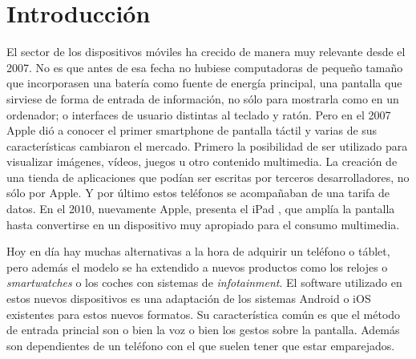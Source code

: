 \documentclass[
10pt, %
a4paper, %
oneside, %
headinclude,footinclude, %
BCOR5mm, %
]{scrartcl}
\begin{document}
{\let\thefootnote\relax{}}

{\let\thefootnote\relax{}}


\newpage %

\section{Introducción}
El sector de los dispositivos móviles ha crecido de manera muy relevante desde el 2007. No es que antes de esa fecha no hubiese computadoras de pequeño tamaño que incorporasen una batería como fuente de energía principal, una pantalla que sirviese de forma de entrada de información, no sólo para mostrarla como en un ordenador; o interfaces de usuario distintas al teclado y ratón. Pero en el 2007 Apple dió a conocer el primer smartphone de pantalla táctil \cite{rob_price_how_2015} y varias de sus características cambiaron el mercado. Primero la posibilidad de ser utilizado para visualizar imágenes, vídeos, juegos u otro contenido multimedia. La creación de una tienda de aplicaciones que podían ser escritas por terceros desarrolladores, no sólo por Apple. Y por último estos teléfonos se acompañaban de una tarifa de datos. En el 2010, nuevamente Apple, presenta el iPad \cite{john_d._sutter_apple_2010}, que amplía la pantalla hasta convertirse en un dispositivo muy apropiado para el consumo multimedia.

Hoy en día hay muchas alternativas a la hora de adquirir un teléfono o táblet, pero además el modelo se ha extendido a nuevos productos como los relojes o \textit{smartwatches} o los coches con sistemas de \textit{infotainment}. El software utilizado en estos nuevos dispositivos es una adaptación de los sistemas Android o iOS existentes para estos nuevos formatos. Su característica común es que el método de entrada princial son o bien la voz o bien los gestos sobre la pantalla. Además son dependientes de un teléfono con el que suelen tener que estar emparejados.
\end{document}

